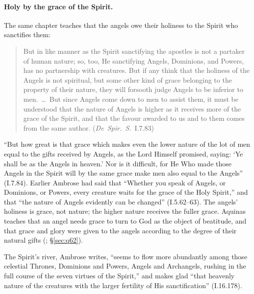 \paragraph{Holy by the grace of the Spirit.} The same chapter teaches that
the angels owe their holiness to the Spirit who sanctifies them:
\begin{quote}
But in like manner as the Spirit sanctifying the apostles is not a
partaker of human nature; so, too, He sanctifying Angels, Dominions, and
Powers, has no partnership with creatures. But if any think that the
holiness of the Angels is not spiritual, but some other kind of grace
belonging to the property of their nature, they will forsooth judge
Angels to be inferior to men.~\dots\ But since Angels come down to men to
assist them, it must be understood that the nature of Angels is higher as
it receives more of the grace of the Spirit, and that the favour awarded
to us and to them comes from the same author. (\emph{De~Spir.~S.}~I.7.83)
\end{quote}
\noindent ``But how great is that grace which makes even the lower nature
of the lot of men equal to the gifts received by Angels, as the Lord
Himself promised, saying: `Ye shall be as the Angels in heaven.' Nor is it
difficult, for He Who made those Angels in the Spirit will by the same
grace make men also equal to the Angels'' (I.7.84). Earlier Ambrose had
said that ``Whether you speak of Angels, or Dominions, or Powers, every
creature waits for the grace of the Holy Spirit,'' and that ``the nature
of Angels evidently can be changed'' (I.5.62--63). The angels'
holiness is grace, not nature; the higher nature receives the fuller
grace. Aquinas teaches that an angel needs grace to turn to God as the
object of beatitude, and that grace and glory were given to the angels
according to the degree of their natural gifts (;
\S\ref{sec:q62}).

The Spirit's river, Ambrose writes, ``seems to flow more abundantly among
those celestial Thrones, Dominions and Powers, Angels and Archangels,
rushing in the full course of the seven virtues of the Spirit,'' and makes
glad ``that heavenly nature of the creatures with the larger fertility of
His sanctification'' (I.16.178).

